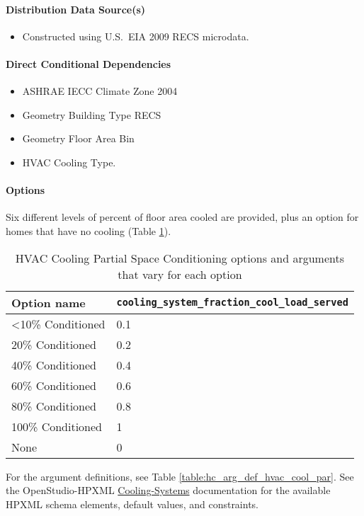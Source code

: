 \paragraph{Distribution Data Source(s)}
\begin{itemize}
\item Constructed using U.S.~EIA 2009 RECS microdata.
\end{itemize}

\paragraph{Direct Conditional Dependencies}
\begin{itemize}
    \item ASHRAE IECC Climate Zone 2004
    \item Geometry Building Type RECS
    \item Geometry Floor Area Bin
    \item HVAC Cooling Type.
\end{itemize}

\paragraph{Options}
Six different levels of percent of floor area cooled are provided, plus an option for homes that have no cooling (Table \ref{table:hc_opt_hvac_cool_par}).

\begin{longtable}[]{|p{3.5cm}|p{3.3cm}|}\caption{HVAC Cooling Partial Space Conditioning options and arguments that vary for each option} \label{table:hc_opt_hvac_cool_par} \\
\toprule\noalign{}
Option name &
\texttt{cooling\_system\_fraction\_cool\_load\_served} \\
\midrule\noalign{}
\endhead
\bottomrule\noalign{}
\endlastfoot
\textless10\% Conditioned & 0.1 \\
20\% Conditioned & 0.2 \\
40\% Conditioned & 0.4 \\
60\% Conditioned & 0.6 \\
80\% Conditioned & 0.8 \\
100\% Conditioned & 1 \\
None & 0 \\
\end{longtable}

For the argument definitions, see Table \ref{table:hc_arg_def_hvac_cool_par}. See the OpenStudio-HPXML \href{https://openstudio-hpxml.readthedocs.io/en/v1.8.1/workflow_inputs.html#hpxml-cooling-systems}{Cooling-Systems} documentation for the available HPXML schema elements, default values, and constraints.

